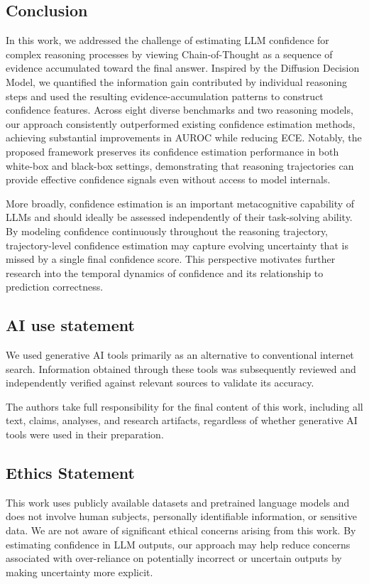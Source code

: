 \documentclass{article} %
\begin{document}
\subsection{Conclusion}

In this work, we addressed the challenge of estimating LLM confidence for complex reasoning processes by viewing Chain-of-Thought as a sequence of evidence accumulated toward the final answer. Inspired by the Diffusion Decision Model, we quantified the information gain contributed by individual reasoning steps and used the resulting evidence-accumulation patterns to construct confidence features. Across eight diverse benchmarks and two reasoning models, our approach consistently outperformed existing confidence estimation methods, achieving substantial improvements in AUROC while reducing ECE. Notably, the proposed framework preserves its confidence estimation performance in both white-box and black-box settings, demonstrating that reasoning trajectories can provide effective confidence signals even without access to model internals.

More broadly, confidence estimation is an important metacognitive capability of  LLMs and should ideally be assessed independently of their task-solving ability. By modeling confidence continuously throughout the reasoning trajectory, trajectory-level confidence estimation may capture evolving uncertainty that is missed by a single final confidence score. This perspective motivates further research into the temporal dynamics of confidence and its relationship to prediction correctness.

\subsection*{AI use statement}
We used generative AI tools primarily as an alternative to conventional internet search.
Information obtained through these tools was subsequently reviewed and independently
verified against relevant sources to validate its accuracy.

The authors take full responsibility for the final content of this work, including all
text, claims, analyses, and research artifacts, regardless of whether generative AI
tools were used in their preparation.

\subsection*{Ethics Statement}
This work uses publicly available datasets and pretrained language models and
does not involve human subjects, personally identifiable information, or
sensitive data. We are not aware of significant ethical concerns arising from
this work. By estimating confidence in LLM outputs, our approach may help
reduce concerns associated with over-reliance on potentially incorrect or
uncertain outputs by making uncertainty more explicit.
\end{document}
